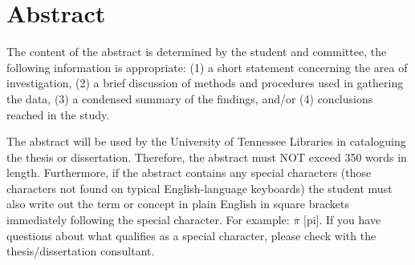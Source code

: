 \chapter*{Abstract} \label{abstract}

The content of the abstract is determined by the student and committee,
the following information is appropriate: (1) a short statement concerning
the area of investigation, (2) a brief discussion of methods and procedures
used in gathering the data, (3) a condensed summary of the findings, and/or
(4) conclusions reached in the study.

The abstract will be used by the University of Tennessee Libraries in cataloguing
the thesis or dissertation. Therefore, the abstract must NOT exceed 350 words
in length. Furthermore, if the abstract contains any special characters
(those characters not found on typical English-language keyboards) the student
must also write out the term or concept in plain English in square brackets
immediately following the special character. For example: $\pi$ [pi].
If you have questions about what qualifies as a special character, please
check with the thesis/dissertation consultant.

